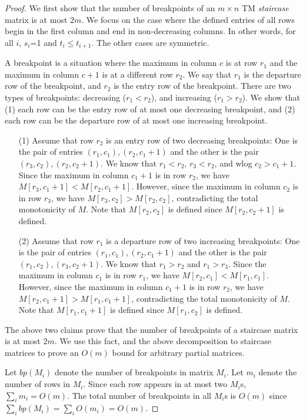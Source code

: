 \documentclass{llncs}
\begin{document}
\begin{proof}
We first show that the number of breakpoints of an $m\times n$ TM {\em staircase} matrix is at
most $2m$.
We focus on the case where the defined entries of all rows begin in the first column and end in non-decreasing columns. In other words, for all $i$, $s_i$=1 and $t_i\le t_{i+1}$. The other cases are symmetric. 

A breakpoint is a situation where the maximum in column $c$ is at row
$r_1$ and the maximum in column $c+1$ is at a different row $r_2$.
We say that $r_1$ is the departure row of the breakpoint, and $r_2$ is
the  entry row of the breakpoint.
There are two types of breakpoints: decreasing ($r_1 < r_2$), and
increasing  ($r_1 > r_2$).
We show that 
(1) each row can be the entry row of at most one decreasing breakpoint, and (2) each row can be the
departure row of at most one increasing breakpoint. 
\begin{enumerate}
\item[(1)] Assume that row $r_2$ is an entry row of two decreasing
  breakpoints:  One is the pair of entries $(r_1,c_1),(r_2,c_1+1)$ and
  the other is the pair  $(r_3,c_2),(r_2,c_2+1)$. We know that
  $r_1<r_2$, $r_3<r_2$, and wlog $c_2>c_1+1$. 
Since the maximum in column $c_1+1$ is in row $r_2$, we have
$M[r_3,c_1+1] < M[r_2,c_1+1]$.
However, since the maximum in column $c_2$ is in row $r_3$, we have
$M[r_3,c_2]  > M[r_2,c_2]$, contradicting the total monotonicity of
$M$. Note that $M[r_2,c_2]$ is defined since $M[r_2,c_2+1]$ is defined.


\item[(2)]
Assume that row $r_1$ is a departure row of two increasing breakpoints:
One is the pair of entries $(r_1,c_1),(r_2,c_1+1)$ and the other is
the pair  $(r_1,c_2),(r_3,c_2+1)$. We know that $r_1>r_2$ and
$r_1>r_3$. 
Since the maximum in column $c_1$ is in row $r_1$, we have
$M[r_2,c_1] < M[r_1,c_1]$.
However, since the maximum in column $c_1+1$ is in row $r_2$, we have
$M[r_2,c_1+1]  > M[r_1,c_1+1]$, contradicting the total monotonicity of
$M$. Note that $M[r_1,c_1+1]$ is defined since $M[r_1,c_2]$ is defined.
\end{enumerate} 

The above two claims prove that the number of breakpoints of a staircase matrix is at
most $2m$.
We use this fact, and the above decomposition to staircase matrices to prove an $O(m)$ bound for arbitrary partial matrices.


Let $bp(M_i)$ denote the number of breakpoints in matrix $M_i$. 
Let $m_i$ denote the number of rows in $M_i$.
Since each row appears in at most two $M_i$s, $\sum_i m_i =
O(m)$.
The total number of breakpoints in all  $M_i$s is
$O(m)$ since 
$\sum_i bp(M_i) = \sum_i O(m_i) = O(m)$.


\end{proof}
\end{document}
